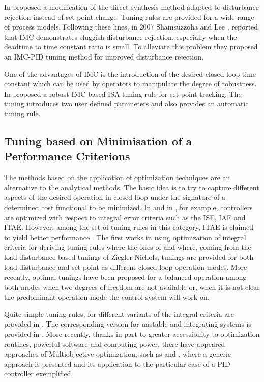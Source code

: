 In \citet{chenseborg2002} proposed a modification of the direct synthesis method adapted to disturbance rejection instead of set-point change. Tuning rules are provided for a wide range of process models. Following these lines, in 2007  Shamsuzzoha and Lee \citet{shamsu2008}, reported that IMC demonstrates sluggish disturbance rejection, especially when the deadtime to time constant ratio is small. To alleviate this problem they proposed an IMC-PID tuning method for improved disturbance rejection.

One of the advantages of IMC is the introduction of the desired closed loop time constant which can be used by operators to manipulate the degree of robustness. In \citet{vilanovaJPC2008} proposed a robust IMC based ISA tuning rule for set-point tracking. The tuning introduces two user defined parameters and also provides an automatic tuning rule.


\subsection{Tuning based on Minimisation of a Performance Criterions}

The methods based on the application of optimization techniques are an alternative to the analytical methods.
The basic idea is to try to capture different aspects of the desired operation in closed loop under the signature of a determined cost functional to be minimized. In \citet{corripio2001} and in \citet{shinskey.1994}, for example, controllers are  optimized with respect to integral error criteria such as the  ISE, IAE and ITAE.  However, among the
set of tuning rules in this category, ITAE is claimed to yield better performance \citet{ogatabook}. The first works in using optimization of integral criteria for deriving tuning rules where the ones of \citet{lopez1967} and \citet{Rovira1969a}   where, coming from the load disturbance based tunings of Ziegler-Nichols, tunings are provided for both load disturbance and set-point as different closed-loop operation modes. More recently, optimal tunings have been proposed \citep{Arrieta2010} for a balanced operation among both modes when two degrees of freedom are not available or, when it is not clear the predominant operation mode the control system will work on.

Quite simple tuning rules, for different variants of the integral criteria are provided in \citet{zhuang1993} . The corresponding version for unstable and integrating systems is provided in \citet{visioli2001}. More recently, thanks in part to greater accessibility to optimization routines, powerful software and computing power, there have appeared approaches of Multiobjective optimization, such as \citet{herreros2002}  and \citet{toivonen2006}, where a generic approach is presented and its application to the particular case of a PID controller exemplified. 

